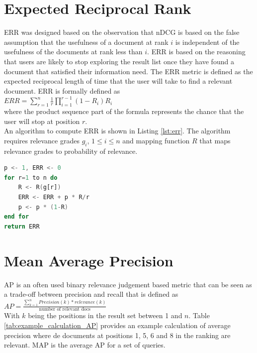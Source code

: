 \section{Expected Reciprocal Rank}
\ac{ERR} \cite{Chapelle2009} was designed based on the observation that \ac{nDCG} is based on the false assumption that the usefulness of a document at rank $i$ is independent of the usefulness of the documents at rank less than $i$. \ac{ERR} is based on the reasoning that users are likely to stop exploring the result list once they have found a document that satisfied their information need. The \ac{ERR} metric is defined as the expected reciprocal length of time that the user will take to find a relevant document. \ac{ERR} is formally defined as\\

$ERR = \sum\nolimits_{r=1}^n \frac{1}{r} \prod\nolimits_{i=1}^{r-1}(1-R_i)R_i$\\

where the product sequence part of the formula represents the chance that the user will stop at position $r$.\\
An algorithm to compute \ac{ERR} is shown in Listing \ref{lst:err}. The algorithm requires relevance grades $g_i$, $1 \le i \le n$ and mapping function $R$ that maps relevance grades to probability of relevance.
\begin{lstlisting}[caption={Algorithm to compute the ERR metric, obtained from \cite{Chapelle2009}}, label={lst:err},language=Ada]
p <- 1, ERR <- 0
for r=1 to n do
	R <- R(g[r])
	ERR <- ERR + p * R/r
	p <- p * (1-R)
end for
return ERR
\end{lstlisting}
\section{Mean Average Precision}
\ac{AP} \cite{Zhu2004} is an often used binary relevance judgement based metric that can be seen as a trade-off between precision and recall that is defined as\\

$AP = \frac{\sum\nolimits_{k=1}^{n}Precision(k)*relevance(k)}{\text{number of relevant docs}}$\\

With $k$ being the positions in the result set between 1 and $n$. Table \ref{tab:example_calculation_AP} provides an example calculation of average precision where de documents at positions 1, 5, 6 and 8 in the ranking are relevant.
\ac{MAP} is the average \ac{AP} for a set of queries.\\

